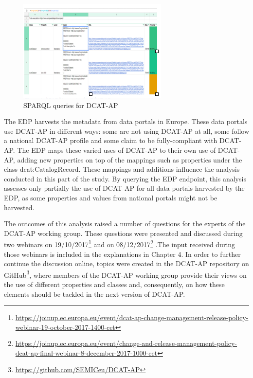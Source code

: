 \documentclass[<options>]{elsarticle}
\begin{document}
\begin{figure}[!h]
\includegraphics{replace1.png}
\caption{SPARQL queries for DCAT-AP}
\end{figure}

The EDP harvests the metadata from data portals in Europe. These data portals use DCAT-AP in different ways: some are not using DCAT-AP at all, some follow a national DCAT-AP profile and some claim to be fully-compliant with DCAT-AP. The EDP maps these varied uses of DCAT-AP to their own use of DCAT-AP, adding new properties on top of the mappings such as properties under the class dcat:CatalogRecord. These mappings and additions influence the analysis conducted in this part of the study. By querying the EDP endpoint, this analysis assesses only partially the use of DCAT-AP for all data portals harvested by the EDP, as some properties and values from national portals might not be harvested.

The outcomes of this analysis raised a number of questions for the experts of the DCAT-AP working group. These questions were presented and discussed during two webinars on 19/10/2017\footnote{\href{ https://joinup.ec.europa.eu/event/dcat-ap-change-management-release-policy-webinar-19-october-2017-1400-cet}{ https://joinup.ec.europa.eu/event/dcat-ap-change-management-release-policy-webinar-19-october-2017-1400-cet}} and on 08/12/2017\footnote{\href{ https://joinup.ec.europa.eu/event/change-and-release-management-policy-dcat-ap-final-webinar-8-december-2017-1000-cet}{ https://joinup.ec.europa.eu/event/change-and-release-management-policy-dcat-ap-final-webinar-8-december-2017-1000-cet}} .The input received during those webinars is included in the explanations in Chapter 4. In order to further continue the discussion online, topics were created in the DCAT-AP repository on GitHub\footnote{\href{  https://github.com/SEMICeu/DCAT-AP}{  https://github.com/SEMICeu/DCAT-AP}}, where members of the DCAT-AP working group provide their views on the use of different properties and classes and, consequently, on how these elements should be tackled in the next version of DCAT-AP.
\end{document}

